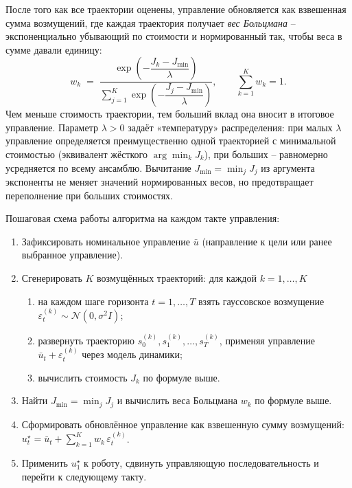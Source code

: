 \documentclass[a4paper,12pt]{extarticle}
\begin{document}
    После того как все траектории оценены, управление обновляется как взвешенная сумма возмущений, где каждая траектория получает \emph{вес Больцмана} -- экспоненциально убывающий по стоимости и нормированный так, чтобы веса в сумме давали единицу:
    $$
    w_k \;=\; \frac{\exp\!\left(-\dfrac{J_k - J_{\min}}{\lambda}\right)}
                   {\displaystyle\sum_{j=1}^{K} \exp\!\left(-\dfrac{J_j - J_{\min}}{\lambda}\right)},
    \qquad \sum_{k=1}^{K} w_k = 1.
    $$
    Чем меньше стоимость траектории, тем больший вклад она вносит в итоговое управление. Параметр $\lambda > 0$ задаёт «температуру» распределения: при малых $\lambda$ управление определяется преимущественно одной траекторией с минимальной стоимостью (эквивалент жёсткого $\arg\min_k J_k$), при больших -- равномерно усредняется по всему ансамблю. Вычитание $J_{\min} = \min_j J_j$ из аргумента экспоненты не меняет значений нормированных весов, но предотвращает переполнение при больших стоимостях.

    Пошаговая схема работы алгоритма на каждом такте управления:
    \begin{enumerate}
        \item Зафиксировать номинальное управление $\bar{u}$ (направление к цели или ранее выбранное управление).
        \item Сгенерировать $K$ возмущённых траекторий: для каждой $k = 1, \dots, K$
            \begin{enumerate}
                \item на каждом шаге горизонта $t = 1, \dots, T$ взять гауссовское возмущение $\varepsilon_t^{(k)} \sim \mathcal{N}(0, \sigma^2 I)$;
                \item развернуть траекторию $s_0^{(k)}, s_1^{(k)}, \dots, s_T^{(k)}$, применяя управление $\bar{u}_t + \varepsilon_t^{(k)}$ через модель динамики;
                \item вычислить стоимость $J_k$ по формуле выше.
            \end{enumerate}
        \item Найти $J_{\min} = \min_j J_j$ и вычислить веса Больцмана $w_k$ по формуле выше.
        \item Сформировать обновлённое управление как взвешенную сумму возмущений: $u_t^\star = \bar{u}_t + \sum_{k=1}^{K} w_k \, \varepsilon_t^{(k)}$.
        \item Применить $u_1^\star$ к роботу, сдвинуть управляющую последовательность и перейти к следующему такту.
    \end{enumerate}
\end{document}
